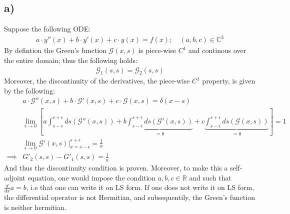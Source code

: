 \documentclass{article}
\begin{document}
\subsection*{a)}
Suppose the following ODE:
\begin{align*}
    a\cdot y''(x) + b\cdot y'(x) + c\cdot y(x) = f(x); \quad (a,b,c) \in \mathbb{C}^3
\end{align*}
By defintion the Green's function $\mathcal{G}(x,s)$ is piece-wise $C^1$ and continous over the entire domain; thus the following holds:
\begin{align*}
    \mathcal{G}_1(s,s) = \mathcal{G}_2(s,s) 
\end{align*}Moreover, the discontinuity of the derivatives, the piece-wise $C^1$ property, is given by the following:
\begin{align*}
    &a\cdot\mathcal{G}''(x,s) + b\cdot\mathcal{G}'(x,s) + c\cdot\mathcal{G}(x,s) = \delta(x-s)\\
    &\lim_{\epsilon\to0}\left[a\int_{s-\epsilon}^{s + \epsilon}ds\left(\mathcal{G}''(x,s)\right) + b\underbrace{\int_{s-\epsilon}^{s + \epsilon}ds\left(\mathcal{G}'(x,s)\right)}_{=0} + c\underbrace{\int_{s - \epsilon}^{s + \epsilon} ds\left(\mathcal{G}(x,s)\right)}_{=0}\right] = 1\\
    &\lim_{\epsilon\to0}\mathcal{G}'(x,s)\Bigg|_{x = s - \epsilon}^{s + \epsilon} = \frac{1}{a}\\
    \implies& G'_2(s,s) - G'_1(s,s) = \frac{1}{a}
\end{align*}And thus the discontinuity condition is proven. Moreover, to make this a self-adjoint equation, one would impose the condition $a,b,c\in\mathbb{R}$ and such that $\frac{d}{dx}a = b$, i.e that one can write it on LS form.
If one does not write it on LS form, the differential operator is not Hermitian, and subsequentily, the Green's function is neither hermitian.
\end{document}
